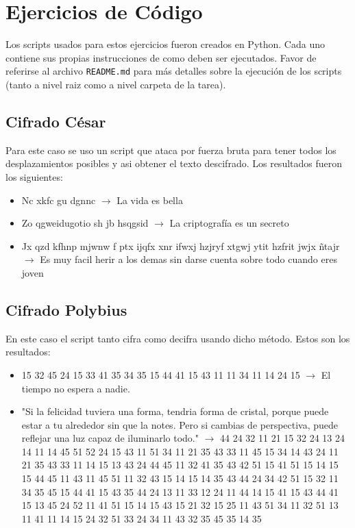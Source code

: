 \section{Ejercicios de Código}

Los scripts usados para estos ejercicios fueron creados en Python. Cada uno contiene
sus propias instrucciones de como deben ser ejecutados. Favor de referirse al archivo
\texttt{README.md} para más detalles sobre la ejecución de los scripts (tanto a nivel
raiz como a nivel carpeta de la tarea).

\subsection{Cifrado César}

Para este caso se uso un script que ataca por fuerza bruta para tener todos los desplazamientos
posibles y asi obtener el texto descifrado. Los resultados fueron los siguientes:

\begin{itemize}
    \item Nc xkfc gu dgnnc $\rightarrow$ La vida es bella
    \item Zo qgweidugotio sh jb hsqgsid $\rightarrow$ La criptografía es un secreto
    \item Jx qzd kfhnp mjwnw f ptx ijqfx xnr ifwxj hzjryf xtgwj ytit hzfrit jwjx ñtajr $\rightarrow$ Es muy facil herir a los demas sin darse cuenta sobre todo cuando eres joven
\end{itemize}

\subsection{Cifrado Polybius}

En este caso el script tanto cifra como decifra usando dicho método. Estos son los resultados:

\begin{itemize}
    \item 15 32 45 24 15 33 41 35 34 35 15 44 41 15 43 11 11 34 11 14 24 15 $\rightarrow$
    El tiempo no espera a nadie.

    \item "Si la felicidad tuviera una forma, tendria forma de cristal, porque puede estar a tu
    alrededor sin que la notes. Pero si cambias de perspectiva, puede reflejar una luz capaz
    de iluminarlo todo." $\rightarrow$ 44 24 32 11 21 15 32 24 13 24 14 11 14 45 51 52 24 15 43 11
    51 34 11 21 35 43 33 11 45 15 34 14 43 24 11 21 35 43 33 11 14 15 13 43 24 44 45 11 32 41 35 43
    42 51 15 41 51 15 14 15 15 44 45 11 43 11 45 51 11 32 43 15 14 15 14 35 43 44 24 34 42 51 15 32
    11 34 35 45 15 44 41 15 43 35 44 24 13 11 33 12 24 11 44 14 15 41 15 43 44 41 15 13 45 24 52 11
    41 51 15 14 15 43 15 21 32 15 25 11 43 51 34 11 32 51 13 11 41 11 14 15 24 32 51 33 24 34 11 43
    32 35 45 35 14 35

\end{itemize}

